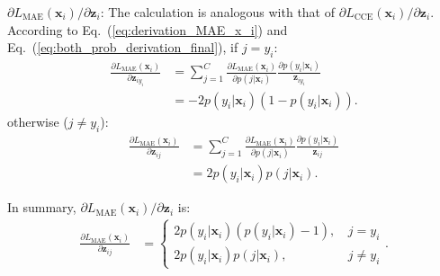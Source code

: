 \documentclass{article}
\begin{document}
\noindent
$\partial L_{\mathrm{MAE}}(\mathbf{x}_i)/ \partial \mathbf{z}_{i}$: 
The calculation is analogous with that of  $\partial L_{\mathrm{CCE}}(\mathbf{x}_i)/ \partial \mathbf{z}_{i}$.
According to Eq.~(\ref{eq:derivation_MAE_x_i}) and Eq.~(\ref{eq:both_prob_derivation_final}), if $j = y_i$:
\begin{equation}
\begin{aligned}
\frac{\partial L_{\mathrm{MAE}}(\mathbf{x}_i)}{\partial \mathbf{z}_{iy_i}} &= \sum_{j=1}^{C}  \frac{\partial L_{\mathrm{MAE}}(\mathbf{x}_i)}{\partial p(j|\mathbf{x}_i)} 
\frac{\partial p(y_i|\mathbf{x}_i)}{\mathbf{z}_{iy_i}} \\
&= -2 p(y_i|\mathbf{x}_i) 
(1-p(y_i|\mathbf{x}_i))
.
\end{aligned}
\end{equation}
otherwise ($j \neq y_i$):
\begin{equation}
\begin{aligned}
\frac{\partial L_{\mathrm{MAE}}(\mathbf{x}_i)}{\partial \mathbf{z}_{ij}} &= \sum_{j=1}^{C}  \frac{\partial L_{\mathrm{MAE}}(\mathbf{x}_i)}{\partial p(j|\mathbf{x}_i)} 
\frac{\partial p(y_i|\mathbf{x}_i)}{\mathbf{z}_{ij}} \\
&= 2 p(y_i|\mathbf{x}_i) 
p(j|\mathbf{x}_i)
.
\end{aligned}
\end{equation}

\noindent
{In summary}, $\partial L_{\mathrm{MAE}}(\mathbf{x}_i)/ \partial \mathbf{z}_{i}$ is:
\begin{equation}
\label{eq:summary_MAE_z}
\begin{aligned}
\frac{\partial L_{\mathrm{MAE}}(\mathbf{x}_i)}{\partial \mathbf{z}_{ij}} 
&=
\begin{cases} 
2 p(y_i|\mathbf{x}_i)
(p(y_i|\mathbf{x}_i)-1)  \text{, } &j = y_i  \\
2 p(y_i|\mathbf{x}_i)
p(j|\mathbf{x}_i)        \text{, } &j \neq y_i
\end{cases}
.
\end{aligned}
\end{equation}
\end{document}
